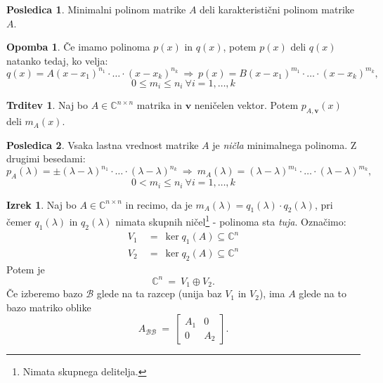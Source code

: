 \documentclass[11pt]{article}
\newcommand{\vv}{\mathbf{v}}
\newcommand{\0}{\mathbf{0}}
\newcommand{\B}{\mathscr{B}}
\theoremstyle{definition}
\theoremstyle{definition}
\newtheorem{trditev}{Trditev}[section]
\theoremstyle{definition}
\newtheorem{izrek}{Izrek}[section]
\theoremstyle{definition}
\newtheorem*{posledica}{Posledica}
\newtheorem*{opomba}{Opomba}
\begin{document}
\begin{posledica}

Minimalni polinom matrike $A$ deli karakteristični polinom matrike $A$.

\end{posledica}
\vspace{0.5cm}

\begin{opomba}

Če imamo polinoma $p(x)$ in $q(x)$, potem $p(x)$ deli $q(x)$ natanko tedaj, ko velja:
$$q(x) = A(x-x_1)^{n_1}\cdot\ldots\cdot(x-x_k)^{n_k} ~\Rightarrow~ p(x) = B(x-x_1)^{m_1}\cdot\ldots\cdot(x-x_k)^{m_k},$$
$$0 \leq m_i \leq n_i ~\forall i = 1,\ldots,k$$

\end{opomba}
\vspace{0.5cm}

\begin{trditev}

Naj bo $A \in \mathbb{C}^{n \times n}$ matrika in $\vv$ neničelen vektor. Potem $p_{A,\vv}(x)$ deli $m_A(x)$.

\end{trditev}
\vspace{0.5cm}

\begin{posledica}

Vsaka lastna vrednost matrike $A$ je \textit{ničla} minimalnega \hbox{polinoma}. Z drugimi besedami:
$$p_A(\lambda) = \pm(\lambda-\lambda)^{n_1}\cdot\ldots\cdot(\lambda-\lambda)^{n_k} ~\Rightarrow~ m_A(\lambda) = (\lambda-\lambda)^{m_1}\cdot\ldots\cdot(\lambda-\lambda)^{m_k},$$
$$0 < m_i \leq n_i ~\forall i = 1,\ldots,k$$

\end{posledica}
\vspace{0.5cm}

\begin{izrek}

Naj bo $A \in \mathbb{C}^{n \times n}$ in recimo, da je $m_A(\lambda) = q_1(\lambda) \cdot q_2(\lambda)$, pri čemer $q_1(\lambda)$ in $q_2(\lambda)$ nimata skupnih ničel\footnote{Nimata skupnega delitelja.} - polinoma sta \textit{tuja}.
Označimo:
\begin{align*}
V_1 ~&=~ \ker q_1(A) \subseteq \mathbb{C}^n \\
V_2 ~&=~ \ker q_2(A) \subseteq \mathbb{C}^n
\end{align*}
Potem je 
$$\mathbb{C}^n ~=~ V_1 \oplus V_2.$$ Če izberemo bazo $\B$ glede na ta razcep (unija baz $V_1$ in $V_2$), ima $A$ glede na to bazo matriko oblike
$$A_{\B\B} ~=~ \begin{bmatrix}
A_1 & 0 \\
0 & A_2
\end{bmatrix}.$$

\end{izrek}
\vspace{0.5cm}
\end{document}
